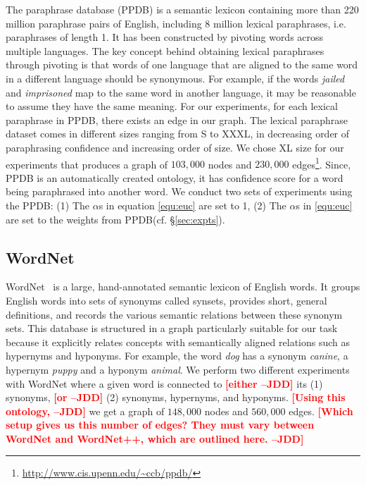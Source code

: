 \documentclass[11pt]{article}
\newcommand{\jdd}[1]{\textcolor{red}{\bf\small [#1 --JDD]}}
\begin{document}
The paraphrase database (PPDB) \cite{ganitkevitch2013ppdb} is a semantic lexicon containing more than 220 million paraphrase pairs of English, including 8 million lexical paraphrases, i.e. paraphrases of length 1. It has been constructed by pivoting words across multiple languages. The key concept behind obtaining lexical paraphrases through pivoting is that words of one language that are aligned to the same word in a different language should be synonymous. For example, if the words \textit{jailed} and \textit{imprisoned} map to the same word in another language, it may be reasonable to assume they have the same meaning. For our experiments, for each lexical paraphrase in PPDB, there exists an edge in our graph. The lexical paraphrase dataset comes in different sizes ranging from S to XXXL, in decreasing order of paraphrasing confidence and increasing order of size. We chose XL size for our experiments that produces a graph of $103,000$ nodes and $230,000$ edges\footnote{\url{http://www.cis.upenn.edu/~ccb/ppdb/}}.
Since, PPDB is an automatically created ontology, it has confidence score for a word being 
paraphrased into another word. We conduct two sets of 
experiments using the 
PPDB: (1) The $\alpha$s in equation \ref{equ:euc} are set to 1, (2) The $\alpha$s in \ref{equ:euc} are set to the weights from PPDB(cf. \S\ref{sec:expts}). 

\subsection{WordNet} 
\label{sec:wordnet}

WordNet~\cite{miller:1995} is a large, hand-annotated semantic lexicon of English words. 
It groups English words into sets of synonyms called synsets, provides short, general definitions, and records the various semantic relations between these synonym sets.
This database is structured in a graph particularly suitable for our task because it explicitly relates concepts with semantically aligned relations such as hypernyms and hyponyms. For example, the word \textit{dog} has a synonym \textit{canine}, a hypernym \textit{puppy} and a hyponym \textit{animal}. We perform two different experiments with WordNet where a given word is connected to \jdd{either}
its (1) synonyms, \jdd{or} (2) synonyms, hypernyms, and hyponyms. 
\jdd{Using this ontology,} we get a graph of $148,000$ nodes and $560,000$ edges. \jdd{Which setup gives us this number of edges? They must vary between WordNet and WordNet++, which are outlined here.}
\end{document}
